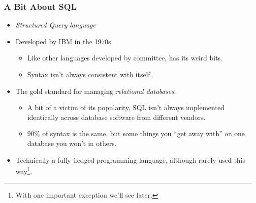 \documentclass[aspectratio=169]{beamer}
\begin{document}
\begin{frame}
    \frametitle{A Bit About SQL}
    \begin{itemize}
        \item \emph{Structured Query language}
        \pause
        \item Developed by IBM in the 1970s
        \pause
        \begin{itemize}
            \item Like other languages developed by committee, has its weird
            bits.
            \item Syntax isn't always consistent with itself. 
        \end{itemize}
        \pause
        \item The gold standard for managing \emph{relational databases}.
        \pause
        \begin{itemize}
            \item A bit of a victim of its popularity, SQL isn't always
            implemented identically across database software from different
            vendors.
            \item 90\% of syntax is the same, but some things you ``get away
            with'' on one database you won't in others.
        \end{itemize}
        \pause
        \item Technically a fully-fledged programming language, although rarely used this way\footnote[frame]{With one important exception we'll see later.}.
    \end{itemize}
\end{frame}
\end{document}
